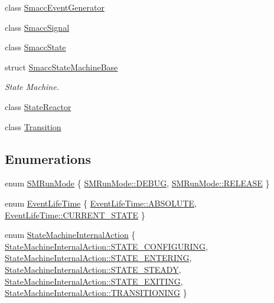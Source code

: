 \begin{DoxyCompactItemize}
\item 
class \hyperlink{classsmacc_1_1SmaccEventGenerator}{Smacc\+Event\+Generator}
\item 
class \hyperlink{classsmacc_1_1SmaccSignal}{Smacc\+Signal}
\item 
class \hyperlink{classsmacc_1_1SmaccState}{Smacc\+State}
\item 
struct \hyperlink{structsmacc_1_1SmaccStateMachineBase}{Smacc\+State\+Machine\+Base}
\begin{DoxyCompactList}\small\item\em State Machine. \end{DoxyCompactList}\item 
class \hyperlink{classsmacc_1_1StateReactor}{State\+Reactor}
\item 
class \hyperlink{classsmacc_1_1Transition}{Transition}
\end{DoxyCompactItemize}
\subsection*{Enumerations}
\begin{DoxyCompactItemize}
\item 
enum \hyperlink{namespacesmacc_a3e4f79486ea6ea6342dd3c712d16a4f6}{S\+M\+Run\+Mode} \{ \hyperlink{namespacesmacc_a3e4f79486ea6ea6342dd3c712d16a4f6adc30ec20708ef7b0f641ef78b7880a15}{S\+M\+Run\+Mode\+::\+D\+E\+B\+UG}, 
\hyperlink{namespacesmacc_a3e4f79486ea6ea6342dd3c712d16a4f6a7d649ef069df9885e382417c79f3d5cd}{S\+M\+Run\+Mode\+::\+R\+E\+L\+E\+A\+SE}
 \}
\item 
enum \hyperlink{namespacesmacc_a5063f47926ad2fe25120ed4b1e7b2c7e}{Event\+Life\+Time} \{ \hyperlink{namespacesmacc_a5063f47926ad2fe25120ed4b1e7b2c7ea3a0bc063b6db8cae0361657958be836f}{Event\+Life\+Time\+::\+A\+B\+S\+O\+L\+U\+TE}, 
\hyperlink{namespacesmacc_a5063f47926ad2fe25120ed4b1e7b2c7ea49b599d413671f16f08d0dd18243c294}{Event\+Life\+Time\+::\+C\+U\+R\+R\+E\+N\+T\+\_\+\+S\+T\+A\+TE}
 \}
\item 
enum \hyperlink{namespacesmacc_a0889aff43c93fe5285109819d2898144}{State\+Machine\+Internal\+Action} \{ \newline
\hyperlink{namespacesmacc_a0889aff43c93fe5285109819d2898144a32406d3560b9f36b3e6e3b84454e1be5}{State\+Machine\+Internal\+Action\+::\+S\+T\+A\+T\+E\+\_\+\+C\+O\+N\+F\+I\+G\+U\+R\+I\+NG}, 
\hyperlink{namespacesmacc_a0889aff43c93fe5285109819d2898144aef27ae3e54b805b81e1efacea3c02575}{State\+Machine\+Internal\+Action\+::\+S\+T\+A\+T\+E\+\_\+\+E\+N\+T\+E\+R\+I\+NG}, 
\hyperlink{namespacesmacc_a0889aff43c93fe5285109819d2898144aaefffb251a9a48e0e3274e9475d22749}{State\+Machine\+Internal\+Action\+::\+S\+T\+A\+T\+E\+\_\+\+S\+T\+E\+A\+DY}, 
\hyperlink{namespacesmacc_a0889aff43c93fe5285109819d2898144a22bd5bb7935dd66f181d92efc273951e}{State\+Machine\+Internal\+Action\+::\+S\+T\+A\+T\+E\+\_\+\+E\+X\+I\+T\+I\+NG}, 
\newline
\hyperlink{namespacesmacc_a0889aff43c93fe5285109819d2898144a5e174e130ee1847f37541ba5786207a3}{State\+Machine\+Internal\+Action\+::\+T\+R\+A\+N\+S\+I\+T\+I\+O\+N\+I\+NG}
 \}
\end{DoxyCompactItemize}
